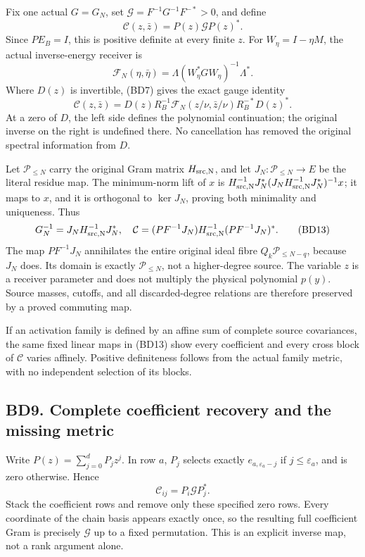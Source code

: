 \documentclass[11pt]{article}
\begin{document}
Fix one actual \(G=G_N\), set \(\mathcal G=F^{-1}G^{-1}F^{-*}>0\), and define \[
\mathcal C(z,\bar z)=P(z)\mathcal G P(z)^*.
\] Since \(PE_B=I\), this is positive definite at every finite \(z\). For \(W_\eta=I-\eta M\), the actual inverse-energy receiver is \[
\mathcal F_N(\eta,\bar\eta)
=\Lambda(W_\eta^*GW_\eta)^{-1}\Lambda^*.
\] Where \(D(z)\) is invertible, (BD7) gives the exact gauge identity \[
\mathcal C(z,\bar z)
=D(z)R_B^{-1}\mathcal F_N(z/\nu,\bar z/\nu)R_B^{-*}D(z)^*. \tag{BD12}
\] At a zero of \(D\), the left side defines the polynomial continuation; the original inverse on the right is undefined there. No cancellation has removed the original spectral information from \(D\).

Let \(\mathcal P_{\le N}\) carry the original Gram matrix \(H_{\rm src,N}\), and let \(J_N:\mathcal P_{\le N}\to E\) be the literal residue map. The minimum-norm lift of \(x\) is \(H_{\rm src,N}^{-1}J_N^*(J_NH_{\rm src,N}^{-1}J_N^*)^{-1}x\); it maps to \(x\), and it is orthogonal to \(\ker J_N\), proving both minimality and uniqueness. Thus \[
G_N^{-1}=J_NH_{\rm src,N}^{-1}J_N^*,\quad
\mathcal C=(PF^{-1}J_N)H_{\rm src,N}^{-1}(PF^{-1}J_N)^*. \tag{BD13}
\] The map \(PF^{-1}J_N\) annihilates the entire original ideal fibre \(Q_k\mathcal P_{\le N-q}\), because \(J_N\) does. Its domain is exactly \(\mathcal P_{\le N}\), not a higher-degree source. The variable \(z\) is a receiver parameter and does not multiply the physical polynomial \(p(y)\). Source masses, cutoffs, and all discarded-degree relations are therefore preserved by a proved commuting map.

If an activation family is defined by an affine sum of complete source covariances, the same fixed linear maps in (BD13) show every coefficient and every cross block of \(\mathcal C\) varies affinely. Positive definiteness follows from the actual family metric, with no independent selection of its blocks.

\subsection{BD9. Complete coefficient recovery and the missing metric}\label{bd9.-complete-coefficient-recovery-and-the-missing-metric}

Write \(P(z)=\sum_{j=0}^dP_jz^j\). In row \(a\), \(P_j\) selects exactly \(e_{a,\varepsilon_a-j}\) if \(j\le\varepsilon_a\), and is zero otherwise. Hence \[
\mathcal C_{ij}=P_i\mathcal G P_j^*.
\] Stack the coefficient rows and remove only these specified zero rows. Every coordinate of the chain basis appears exactly once, so the resulting full coefficient Gram is precisely \(\mathcal G\) up to a fixed permutation. This is an explicit inverse map, not a rank argument alone.
\end{document}
